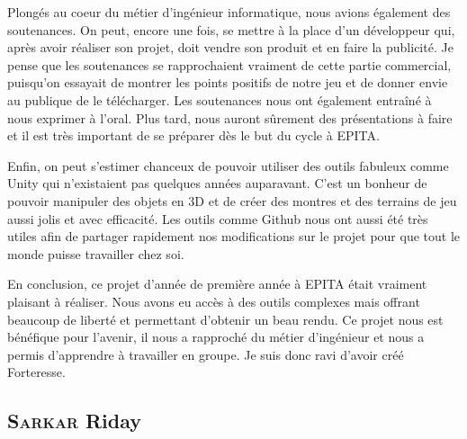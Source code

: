 \documentclass[a4paper, 12pt]{article}
\begin{document}
\medbreak
\par Plongés au coeur du métier d’ingénieur informatique, nous avions également des soutenances. On peut, encore une fois, se mettre à la place d’un développeur qui, après avoir réaliser son projet, doit vendre son produit et en faire la publicité. Je pense que les soutenances se rapprochaient vraiment de cette partie commercial, puisqu’on essayait de montrer les points positifs de notre jeu et de donner envie au publique de le télécharger. Les soutenances nous ont également entraîné à nous exprimer à l’oral. Plus tard, nous auront sûrement des présentations à faire et il est très important de se préparer dès le but du cycle à EPITA. 
\medbreak
\par Enfin, on peut s’estimer chanceux de pouvoir utiliser des outils fabuleux comme Unity qui n’existaient pas quelques années auparavant. C’est un bonheur de pouvoir manipuler des objets en 3D et de créer des montres et des terrains de jeu aussi jolis et avec efficacité. Les outils comme Github nous ont aussi été très utiles afin de partager rapidement nos modifications sur le projet pour que tout le monde puisse travailler chez soi.
\medbreak
\par En conclusion, ce projet d’année de première année à EPITA était vraiment plaisant à réaliser. Nous avons eu accès à des outils complexes mais offrant beaucoup de liberté et permettant d’obtenir un beau rendu. Ce projet nous est bénéfique pour l’avenir, il nous a rapproché du métier d’ingénieur et nous a permis d’apprendre à travailler en groupe. Je suis donc ravi d’avoir créé Forteresse.

\subsection{\textsc{Sarkar} Riday}
\end{document}
